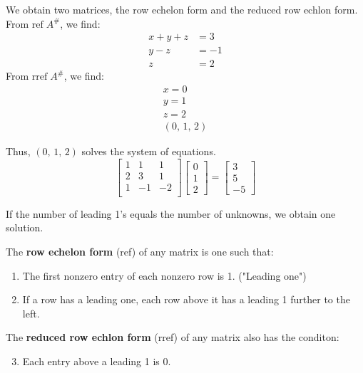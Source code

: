 \documentclass[../main.tex]{subfiles}
\begin{document}
\begin{example}[]
    We obtain two matrices, the row echelon form and the reduced row echlon form.
    From \( \text{ref} \; A^\# \), we find:
    \begin{align*}
        x + y + z &= 3 \\
        y - z &= -1 \\
        z &= 2
    \end{align*}
    From \( \text{rref} \; A^\# \), we find:
    \begin{gather*}
        x = 0 \\
        y = 1 \\
        z = 2 \\
        \boxed{(0, \, 1, \, 2)}
    \end{gather*}

    Thus, \( (0, \, 1, \, 2) \) solves the system of equations.
    \[
        \begin{bmatrix}
            1 & 1 & 1 \\
            2 & 3 & 1 \\
            1 & -1 & -2 \\
        \end{bmatrix}
        \begin{bmatrix}
            0 \\
            1 \\
            2
        \end{bmatrix}
        =
        \begin{bmatrix}
            3 \\
            5 \\
            -5
        \end{bmatrix}
    \]

    \begin{note}
        If the number of leading 1's equals the number of unknowns, we obtain one solution.
    \end{note}
\end{example}

\begin{definition}
    The \textbf{row echelon form} (ref) of any matrix is one such that:
    \begin{enumerate}[label=(\alph*)]
        \item The first nonzero entry of each nonzero row is 1. ("Leading one")
        \item If a row has a leading one, each row above it has a leading 1 further to the left.
    \end{enumerate}

    The \textbf{reduced row echlon form} (rref) of any matrix also has the conditon:
    \begin{enumerate}[label=(\alph*)]
        \setcounter{enumi}{2}
        \item Each entry above a leading 1 is 0.
    \end{enumerate}
\end{definition}
\end{document}
